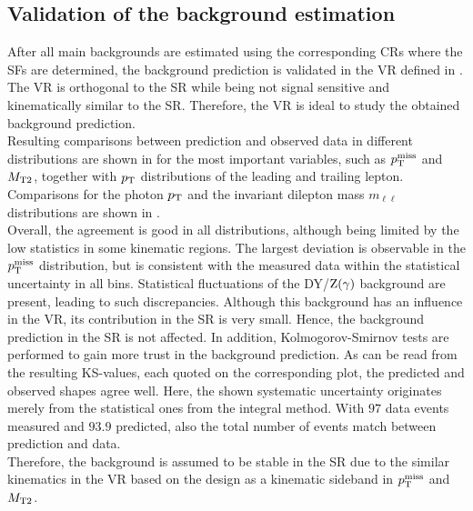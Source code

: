 \FloatBarrier
\subsection{Validation of the background estimation}\label{sec:Validation}
After all main backgrounds are estimated using the corresponding CRs where the SFs are determined, the background prediction is validated in the VR defined in . The VR is orthogonal to the SR while being not signal sensitive and kinematically similar to the SR. Therefore, the VR is ideal to study the obtained background prediction.\\
Resulting comparisons between prediction and observed data in different distributions are shown in  for the most important variables, such as $p_{\mathrm{T}}^\text{miss}$ and $M_{\mathrm{T2}}$, together with $p_{\mathrm{T}}$ distributions of the leading and trailing lepton. Comparisons for the photon $p_{\mathrm{T}}$ and the invariant dilepton mass $m_{\ell\ell}$ distributions are shown in .\\
Overall, the agreement is good in all distributions, although being limited by the low statistics in some kinematic regions. The largest deviation is observable in the $p_{\mathrm{T}}^\text{miss}$ distribution, but is consistent with the measured data within the statistical uncertainty in all bins. Statistical fluctuations of the DY/$\mathrm{Z}(\gamma)$ background are present, leading to such discrepancies. Although this background has an influence in the VR, its contribution in the SR is very small. Hence, the background prediction in the SR is not affected. In addition, Kolmogorov-Smirnov tests are performed to gain more trust in the background prediction. As can be read from the resulting KS-values, each quoted on the corresponding plot, the predicted and observed shapes agree well. Here, the shown systematic uncertainty originates merely from the statistical ones from the integral method. With $97$ data events measured and $93.9$ predicted, also the total number of events match between prediction and data.\\
Therefore, the background is assumed to be stable in the SR due to the similar kinematics in the VR based on the design as a kinematic sideband in $p_{\mathrm{T}}^\text{miss}$ and $M_{\mathrm{T2}}$.
